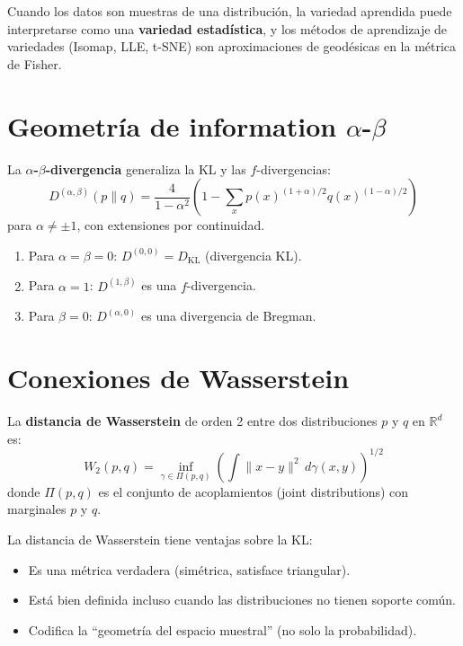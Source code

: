 \begin{proposition}
	Cuando los datos son muestras de una distribución, la variedad aprendida puede interpretarse como una \textbf{variedad estadística}, y los métodos de aprendizaje de variedades (Isomap, LLE, t-SNE) son aproximaciones de geodésicas en la métrica de Fisher.
\end{proposition}

\section{Geometría de information $\alpha$-$\beta$}

\begin{definition}
	La \textbf{$\alpha$-$\beta$-divergencia} generaliza la KL y las $f$-divergencias:
	\[
	D^{(\alpha,\beta)}(p \| q) = \frac{4}{1-\alpha^2}\left(1 - \sum_x p(x)^{(1+\alpha)/2} q(x)^{(1-\alpha)/2}\right)
	\]
	para $\alpha \ne \pm 1$, con extensiones por continuidad.
\end{definition}

\begin{theorem}[Propiedades]
	\begin{enumerate}
		\item Para $\alpha = \beta = 0$: $D^{(0,0)} = D_{\mathrm{KL}}$ (divergencia KL).
		\item Para $\alpha = 1$: $D^{(1,\beta)}$ es una $f$-divergencia.
		\item Para $\beta = 0$: $D^{(\alpha,0)}$ es una divergencia de Bregman.
	\end{enumerate}
\end{theorem}

\section{Conexiones de Wasserstein}

\begin{definition}
	La \textbf{distancia de Wasserstein} de orden 2 entre dos distribuciones $p$ y $q$ en $\mathbb{R}^d$ es:
	\[
	W_2(p, q) = \inf_{\gamma \in \Pi(p,q)} \left(\int \|x - y\|^2 \, d\gamma(x,y)\right)^{1/2}
	\]
	donde $\Pi(p,q)$ es el conjunto de acoplamientos (joint distributions) con marginales $p$ y $q$.
\end{definition}

\begin{proposition}
	La distancia de Wasserstein tiene ventajas sobre la KL:
	\begin{itemize}
		\item Es una métrica verdadera (simétrica, satisface triangular).
		\item Está bien definida incluso cuando las distribuciones no tienen soporte común.
		\item Codifica la ``geometría del espacio muestral'' (no solo la probabilidad).
	\end{itemize}
\end{proposition}

